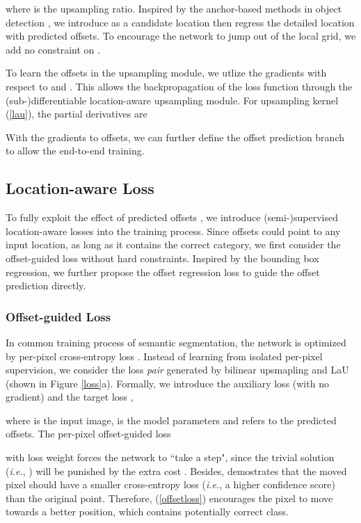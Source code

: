 \documentclass[10pt,twocolumn,letterpaper]{article}
\begin{document}
where  is the upsampling ratio. Inspired by the anchor-based methods in object detection \cite{Girshick15, RenHGS15}, we introduce  as a candidate location then regress the detailed location with predicted offsets. To encourage the network to jump out of the local grid, we add no constraint on . 

To learn the offsets in the upsampling module, we utlize the gradients with respect to  and . This allows the backpropagation of the loss function through the (sub-)differentiable location-aware upsampling module. For upsampling kernel (\ref{lau}), the partial derivatives are

With the gradients to offsets, we can further define the offset prediction branch to allow the end-to-end training.

\subsection{Location-aware Loss}
To fully exploit the effect of predicted offsets , we introduce (semi-)supervised location-aware losses into the training process. Since offsets could point to any input location, as long as it contains the correct category, we first consider the offset-guided loss without hard constraints. Inspired by the bounding box regression, we further propose the offset regression loss to guide the offset prediction directly. 

\subsubsection{Offset-guided Loss}
In common training process of semantic segmentation, the network is optimized by per-pixel cross-entropy loss . Instead of learning from isolated per-pixel supervision, we consider the  loss \textit{pair} generated by bilinear upsmapling and LaU (shown in Figure \ref{loss}a). Formally, we introduce the auxiliary loss  (with no gradient) and the target loss ,

where  is the input image,  is the model parameters and  refers to the predicted offsets. The per-pixel offset-guided loss

with loss weight  forces the network to ``take a step", since the trivial solution  (\textit{i.e.}, ) will be punished by the extra cost . Besides,  demostrates that the moved pixel should have a smaller cross-entropy loss (\textit{i.e.}, a higher confidence score) than the original point. Therefore,  (\ref{offsetloss}) encourages the pixel to move towards a better position, which contains potentially correct class.  
\end{document}
